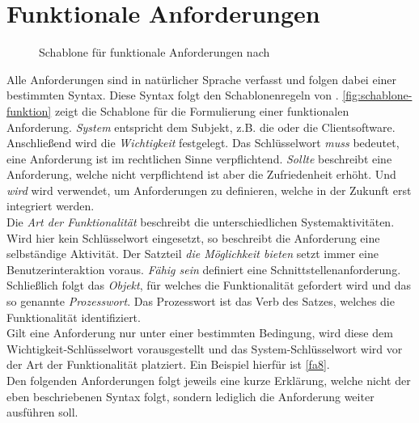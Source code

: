 \section{Funktionale Anforderungen}
\label{sec:funktionale}

\begin{figure}
    \centering
    
    \caption{Schablone für funktionale Anforderungen nach }
    \label{fig:schablone-funktion}
\end{figure}

Alle Anforderungen sind in natürlicher Sprache verfasst und folgen dabei einer bestimmten Syntax. Diese
Syntax folgt den Schablonenregeln von . \autoref{fig:schablone-funktion} zeigt die
Schablone für die Formulierung einer funktionalen Anforderung. \emph{System} entspricht dem 
Subjekt, z.B. die \shst{} oder die Clientsoftware. Anschließend wird die \emph{Wichtigkeit} festgelegt. 
Das Schlüsselwort \emph{muss} bedeutet, eine Anforderung ist im rechtlichen Sinne verpflichtend. \emph{Sollte} 
beschreibt eine Anforderung, welche nicht verpflichtend ist aber die Zufriedenheit erhöht. Und \emph{wird}
wird verwendet, um Anforderungen zu definieren, welche in der Zukunft erst integriert werden.\\
Die \emph{Art der Funktionalität} beschreibt die unterschiedlichen Systemaktivitäten. Wird hier kein Schlüsselwort
eingesetzt, so beschreibt die Anforderung eine selbständige Aktivität. Der Satzteil \emph{die Möglichkeit bieten}
setzt immer eine Benutzerinteraktion voraus. \emph{Fähig sein} definiert eine Schnittstellenanforderung.\\
Schließlich folgt das \emph{Objekt}, für welches die Funktionalität gefordert wird und das so genannte \emph{Prozesswort}. Das
Prozesswort ist das Verb des Satzes, welches die Funktionalität identifiziert.\\
Gilt eine Anforderung nur unter einer bestimmten Bedingung, wird diese dem Wichtigkeit-Schlüsselwort vorausgestellt und
das System-Schlüsselwort wird vor der Art der Funktionalität platziert. Ein Beispiel hierfür ist \ref{fa8}.\\

Den folgenden Anforderungen folgt jeweils eine kurze Erklärung, welche nicht der eben beschriebenen Syntax folgt,
sondern lediglich die Anforderung weiter ausführen soll. 

